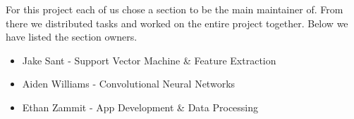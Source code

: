 For this project each of us chose a section to be the main maintainer of.
From there we distributed tasks and worked on the entire project together.
Below we have listed the section owners.

\begin{itemize}

    \item Jake Sant - Support Vector Machine \& Feature Extraction

    \item Aiden Williams - Convolutional Neural Networks

    \item Ethan Zammit - App Development \& Data Processing

\end{itemize}